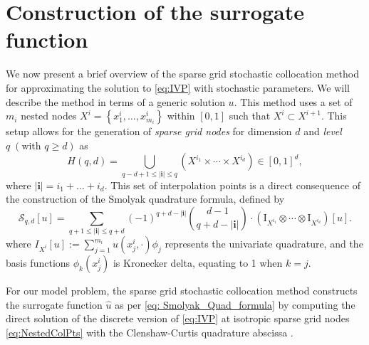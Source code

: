 \documentclass[final,3p,times,11pt]{elsarticle}
\begin{document}
\section{Construction of the surrogate function}
We now present a brief overview of the sparse grid stochastic collocation method \cite{BaNoRi:2000, KlBa:2005, MaNi:2009, Sm:1963} for approximating the solution to \eqref{eq:IVP} with stochastic parameters. We will describe the method in terms of a generic solution $u$. This method uses a set of $m_i$ nested nodes $X^i = \left\{x_1^i,\ldots, x_{m_i}^i\right\}$ within $[0,1]$ such that $X^{i}\subset X^{i+1}$. This setup allows for the generation of {\it sparse grid nodes} for dimension $d$ and {\it level} $q\; (\text{with }q\ge d)$ as 
%
\begin{equation}
\label{eq:NestedColPts}
H(q,d) = \bigcup_{q-d+1\le|\boldsymbol{i}|\le q} \left(X^{i_1}\times \cdots\times X^{i_d}\right)\in [0,1]^d, 
\end{equation}
where  $|\boldsymbol{i}| = i_1+\ldots+i_d$. This set of interpolation points is a direct consequence of the construction of the  Smolyak quadrature formula, defined by 
\begin{equation}
\label{eq: Smolyak_Quad_formula}
\mathscr{S}_{q,d}[u] = \sum_{q+1\le |\boldsymbol{i}|\le q+d} (-1)^{q+d-|\boldsymbol{i}|} \binom{d-1}{q+d-|\boldsymbol{i}|}\cdot \left(\mathrm I_{X^{i_1}}\otimes\cdots\otimes \mathrm I_{X^{i_d}}\right) [u].
\end{equation} 
where $I_{X^{i}}[u]:=\sum_{j=1}^{m_{i}} u(x_j^i,\cdot)\phi_j$ represents the univariate quadrature, and the basis functions $\phi_k(x_j^i)$ is Kronecker delta, equating to 1 when $k=j$.

 
For our model problem, the sparse grid stochastic collocation method constructs the surrogate function $\widehat{u}$ as per \eqref{eq: Smolyak_Quad_formula} by computing the direct solution of the discrete version of \eqref{eq:IVP} at isotropic sparse grid nodes \eqref{eq:NestedColPts} with the Clenshaw-Curtis quadrature abscissa  \cite{BaNoRi:2000,ClCu:1960}. 
\end{document}
